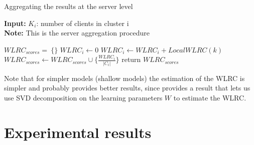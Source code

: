 \documentclass{article}
\begin{document}
\begin{algorithm}[H]
\caption{Aggregating the results at the server level}
\label{alg:fedalrc}
\textbf{Input:} $K_i$: number of clients in cluster i\\
\textbf{Note:} This is the server aggregation procedure

\begin{algorithmic}[1]
\STATE $WLRC_{scores}=\ \{\}$
    \STATE $WLRC_i \gets 0$
        \STATE $WLRC_i \gets WLRC_i + LocalWLRC(k)$
    \ENDFOR
    $WLRC_{scores} \gets WLRC_{scores} \cup \{\frac{WLRC_i}{|C_i|}\}$
\ENDFOR
\STATE return $WLRC_{scores}$
\end{algorithmic}
\end{algorithm}
Note that for simpler models (shallow models) the estimation of the WLRC is simpler and probably provides better results, since \cite{WLRC} provides a result that lets us use SVD decomposition on the learning parameters $W$ to estimate the WLRC.


\section{Experimental results}
\end{document}
